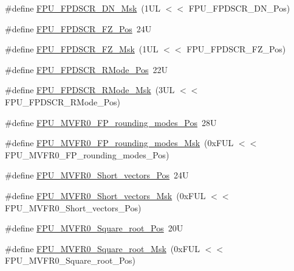 \begin{DoxyCompactItemize}
\#define \hyperlink{group___c_m_s_i_s___f_p_u_ga40c2d4a297ca2ceffe174703a4ad17f6}{F\+P\+U\+\_\+\+F\+P\+D\+S\+C\+R\+\_\+\+D\+N\+\_\+\+Msk}~(1\+U\+L $<$$<$ F\+P\+U\+\_\+\+F\+P\+D\+S\+C\+R\+\_\+\+D\+N\+\_\+\+Pos)
\item 
\#define \hyperlink{group___c_m_s_i_s___f_p_u_gab3c2fc96e312ba47b902d5f80d9b8575}{F\+P\+U\+\_\+\+F\+P\+D\+S\+C\+R\+\_\+\+F\+Z\+\_\+\+Pos}~24U
\item 
\#define \hyperlink{group___c_m_s_i_s___f_p_u_gaae7d901442d4af97c6d22939cffc8ad9}{F\+P\+U\+\_\+\+F\+P\+D\+S\+C\+R\+\_\+\+F\+Z\+\_\+\+Msk}~(1\+U\+L $<$$<$ F\+P\+U\+\_\+\+F\+P\+D\+S\+C\+R\+\_\+\+F\+Z\+\_\+\+Pos)
\item 
\#define \hyperlink{group___c_m_s_i_s___f_p_u_ga7aeedf36be8f170dd3e276028e8e29ed}{F\+P\+U\+\_\+\+F\+P\+D\+S\+C\+R\+\_\+\+R\+Mode\+\_\+\+Pos}~22U
\item 
\#define \hyperlink{group___c_m_s_i_s___f_p_u_ga449beb50211f8e97df6b2640c82c4741}{F\+P\+U\+\_\+\+F\+P\+D\+S\+C\+R\+\_\+\+R\+Mode\+\_\+\+Msk}~(3\+U\+L $<$$<$ F\+P\+U\+\_\+\+F\+P\+D\+S\+C\+R\+\_\+\+R\+Mode\+\_\+\+Pos)
\item 
\#define \hyperlink{group___c_m_s_i_s___f_p_u_ga1ebcc9076f08013f0ea814540df03e82}{F\+P\+U\+\_\+\+M\+V\+F\+R0\+\_\+\+F\+P\+\_\+rounding\+\_\+modes\+\_\+\+Pos}~28U
\item 
\#define \hyperlink{group___c_m_s_i_s___f_p_u_gae6dc9339ac72227d5d54360bb9fbef1b}{F\+P\+U\+\_\+\+M\+V\+F\+R0\+\_\+\+F\+P\+\_\+rounding\+\_\+modes\+\_\+\+Msk}~(0x\+F\+U\+L $<$$<$ F\+P\+U\+\_\+\+M\+V\+F\+R0\+\_\+\+F\+P\+\_\+rounding\+\_\+modes\+\_\+\+Pos)
\item 
\#define \hyperlink{group___c_m_s_i_s___f_p_u_gabbf83a918536ebf10889cee71a0404c7}{F\+P\+U\+\_\+\+M\+V\+F\+R0\+\_\+\+Short\+\_\+vectors\+\_\+\+Pos}~24U
\item 
\#define \hyperlink{group___c_m_s_i_s___f_p_u_gabf261a72023fdfc64f32c6b21d55c5b9}{F\+P\+U\+\_\+\+M\+V\+F\+R0\+\_\+\+Short\+\_\+vectors\+\_\+\+Msk}~(0x\+F\+U\+L $<$$<$ F\+P\+U\+\_\+\+M\+V\+F\+R0\+\_\+\+Short\+\_\+vectors\+\_\+\+Pos)
\item 
\#define \hyperlink{group___c_m_s_i_s___f_p_u_ga176c85453ba03257bf263adec05f7344}{F\+P\+U\+\_\+\+M\+V\+F\+R0\+\_\+\+Square\+\_\+root\+\_\+\+Pos}~20U
\item 
\#define \hyperlink{group___c_m_s_i_s___f_p_u_ga3ec0bfec1640bdaf9dff027f275b446d}{F\+P\+U\+\_\+\+M\+V\+F\+R0\+\_\+\+Square\+\_\+root\+\_\+\+Msk}~(0x\+F\+U\+L $<$$<$ F\+P\+U\+\_\+\+M\+V\+F\+R0\+\_\+\+Square\+\_\+root\+\_\+\+Pos)
\item 

\end{DoxyCompactItemize}
